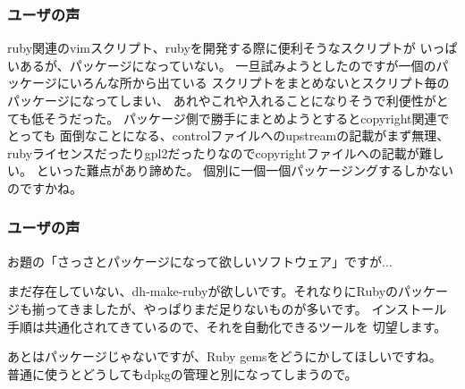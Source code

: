 \documentclass[cjk,dvipdfmx]{beamer}
\begin{document}
\begin{frame}
 \frametitle{ユーザの声}
ruby関連のvimスクリプト、rubyを開発する際に便利そうなスクリプトが
いっぱいあるが、パッケージになっていない。
一旦試みようとしたのですが一個のパッケージにいろんな所から出ている
スクリプトをまとめないとスクリプト毎のパッケージになってしまい、
あれやこれや入れることになりそうで利便性がとても低そうだった。
パッケージ側で勝手にまとめようとするとcopyright関連でとっても
面倒なことになる、controlファイルへのupstreamの記載がまず無理、
rubyライセンスだったりgpl2だったりなのでcopyrightファイルへの記載が難しい。
といった難点があり諦めた。
個別に一個一個パッケージングするしかないのですかね。
\end{frame}
\begin{frame}
 \frametitle{ユーザの声}

お題の「さっさとパッケージになって欲しいソフトウェア」ですが...

まだ存在していない、dh-make-rubyが欲しいです。それなりにRubyのパッケー
ジも揃ってきましたが、やっぱりまだ足りないものが多いです。
インストール手順は共通化されてきているので、それを自動化できるツールを
切望します。

あとはパッケージじゃないですが、Ruby gemsをどうにかしてほしいですね。
普通に使うとどうしてもdpkgの管理と別になってしまうので。
\end{frame}
\end{document}
